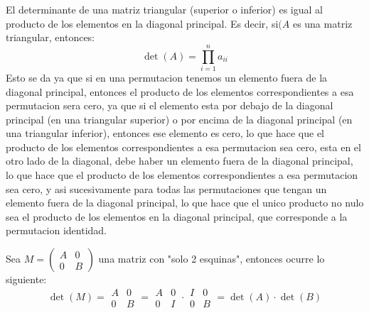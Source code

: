 \begin{corolario}
    El determinante de una matriz triangular (superior o inferior) es igual al producto de los elementos en la diagonal principal. Es decir, si$( A $ es una matriz triangular, entonces:
    \[
        \det(A) = \prod_{i=1}^{n} a_{ii}
    \]
    Esto se da ya que si en una permutacion tenemos un elemento fuera de la diagonal principal, entonces el producto de los elementos correspondientes a esa permutacion sera cero, ya que si el elemento esta por debajo de la diagonal principal (en una triangular superior) o por encima de la diagonal principal (en una triangular inferior), entonces ese elemento es cero, lo que hace que el producto de los elementos correspondientes a esa permutacion sea cero, esta en el otro lado de la diagonal, debe haber un elemento fuera de la diagonal principal, lo que hace que el producto de los elementos correspondientes a esa permutacion sea cero, y asi sucesivamente para todas las permutaciones que tengan un elemento fuera de la diagonal principal, lo que hace que el unico producto no nulo sea el producto de los elementos en la diagonal principal, que corresponde a la permutacion identidad.
\end{corolario}

\begin{corolario}
    Sea $M = \left( \begin{array}{c|c} A & 0 \\ \hline 0 & B \end{array} \right)$ una matriz con "solo 2 esquinas", entonces ocurre lo siguiente:
    \[
        \det(M) =
        \begin{array}{|c|c|}
            A & 0 \\
            \hline
            0 & B
        \end{array} =
        \begin{array}{|c|c|}
            A & 0 \\
            \hline
            0 & I
        \end{array}
        \cdot
        \begin{array}{|c|c|}
            I & 0 \\
            \hline
            0 & B
        \end{array} =
        \det(A) \cdot \det(B)
    \]
\end{corolario}

